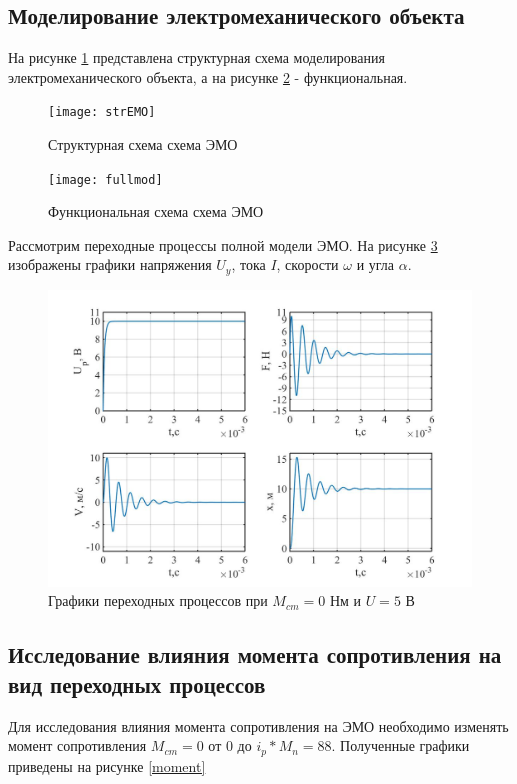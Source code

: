 \documentclass[a4paper, 12pt]{article}
\begin{document}
\newpage

\begin{center}
	\section{Моделирование электромеханического объекта}
\end{center}
На рисунке \ref{strEMO} представлена структурная схема моделирования электромеханического объекта, а на рисунке \ref{funcEMO}  - функциональная.

\begin{figure}[h!]
	\centering
	\texttt{[image: strEMO]}
	\caption{Структурная схема схема ЭМО}
	\label{strEMO}
\end{figure}
\begin{figure}[h!]
	\centering
	\texttt{[image: fullmod]}
	\caption{Функциональная схема схема ЭМО}
	\label{funcEMO}
\end{figure}

Рассмотрим переходные процессы полной модели ЭМО.
На рисунке \ref{begin} изображены графики напряжения $U_y$, тока $I$, скорости $\omega$ и угла $\alpha$.

\newpage
\begin{figure}[h!]
	\centering
	\includegraphics[width = 1\textwidth]{data/begin}
	\caption{Графики переходных процессов при $M_{cm}=0$ Нм и $U=5$ В}
	\label{begin}
\end{figure}  

\newpage
\begin{center}
\section{Исследование влияния момента сопротивления на вид переходных процессов}
\end{center}\par
Для исследования влияния момента сопротивления на ЭМО необходимо изменять момент сопротивления $M_{cm}=0$ от 0 до $i_p*M_n=88$. Полученные графики приведены на рисунке \ref{moment}
\end{document}
